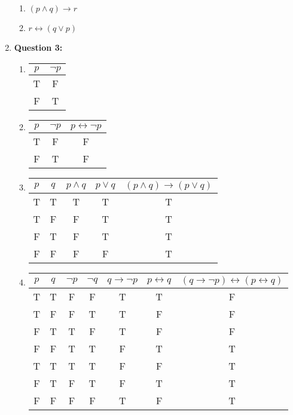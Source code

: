 \documentclass[11pt]{article}
\begin{document}
\begin{enumerate}
\begin{enumerate}[label=(\alph*)]
\item
$(p \land q) \rightarrow r$

\item
$r \leftrightarrow (q \lor p)$

\end{enumerate}

\item
\textbf{Question 3:}

\begin{enumerate}[label=(\alph*)]
\item
\begin{center}
\begin{tabular}{|c|c|}
\hline
$p$ & $\lnot p$ \\
\hline
T & F\\
F & T\\
\hline
\end{tabular}
\end{center}

\item
\begin{center}
\begin{tabular}{|c|c|c|}
\hline
$p$ & $\lnot p$ & $p \leftrightarrow \lnot p$\\
\hline
T & F & F\\
F & T & F\\
\hline
\end{tabular}
\end{center}

\item
\begin{center}
\begin{tabular}{|c|c|c|c|c|}
\hline
$p$ & $q$ & $p \land q$ & $p \lor q$ & $(p \land q) \rightarrow (p \lor q)$\\
\hline
T & T & T & T & T\\
T & F & F & T & T\\
F & T & F & T & T\\
F & F & F & F & T\\
\hline
\end{tabular}
\end{center}

\item
\begin{center}
\begin{tabular}{|c|c|c|c|c|c|c|}
\hline
$p$ & $q$ & $\lnot p$ & $\lnot q$ & $q \rightarrow \lnot p$ & $p \leftrightarrow q$ & $(q \rightarrow \lnot p) \leftrightarrow (p \leftrightarrow q)$\\
\hline
T & T & F & F & T & T & F\\
T & F & F & T & T & F & F\\
F & T & T & F & T & F & F\\
F & F & T & T & F & T & T\\
T & T & T & T & F & F & T\\
F & T & F & T & F & T & T\\
F & F & F & F & T & F & T\\
\hline
\end{tabular}
\end{center}
\end{enumerate}


\end{enumerate}
\end{document}
